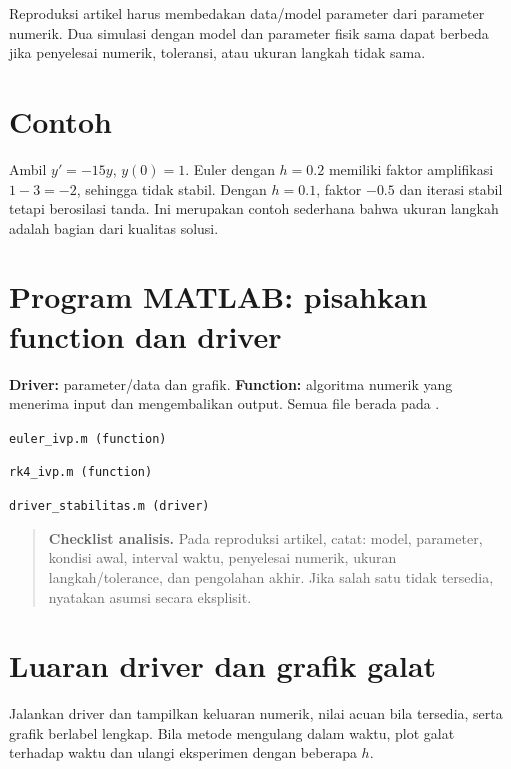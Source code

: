 \documentclass[book,english,noindex,lean,nobackpage,nocopyright,noupdate,nofiglist,notablist]{enacom}
\newcommand{\AnalysisCheck}[1]{\begin{quote}\textbf{Checklist analisis.} #1\end{quote}}
\newcommand{\MatlabFile}[1]{\par\smallskip\noindent\texttt{#1}\par}
\begin{document}
Reproduksi artikel harus membedakan data/model parameter dari parameter numerik. Dua simulasi dengan model dan parameter fisik sama dapat berbeda jika penyelesai numerik, toleransi, atau ukuran langkah tidak sama.

\section{Contoh}
Ambil $y'=-15y$, $y(0)=1$. Euler dengan $h=0.2$ memiliki faktor amplifikasi $1-3=-2$, sehingga tidak stabil. Dengan $h=0.1$, faktor $-0.5$ dan iterasi stabil tetapi berosilasi tanda. Ini merupakan contoh sederhana bahwa ukuran langkah adalah bagian dari kualitas solusi.

\section{Program MATLAB: pisahkan function dan driver}
\textbf{Driver:} parameter/data dan grafik. \textbf{Function:} algoritma numerik yang menerima input dan mengembalikan output. Semua file berada pada .

\MatlabFile{euler\_ivp.m (function)}


\MatlabFile{rk4\_ivp.m (function)}


\MatlabFile{driver\_stabilitas.m (driver)}



\AnalysisCheck{Pada reproduksi artikel, catat: model, parameter, kondisi awal, interval waktu, penyelesai numerik, ukuran langkah/tolerance, dan pengolahan akhir. Jika salah satu tidak tersedia, nyatakan asumsi secara eksplisit.}

\section{Luaran driver dan grafik galat}
Jalankan driver dan tampilkan keluaran numerik, nilai acuan bila tersedia, serta grafik berlabel lengkap. Bila metode mengulang dalam waktu, plot galat terhadap waktu dan ulangi eksperimen dengan beberapa $h$.
\end{document}
